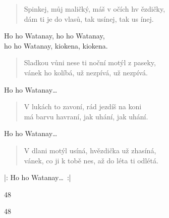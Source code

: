 \begin{song}{}
\begin{verse}
   Spinkej, můj maličký, máš v očích hv ězdičky, \\
   dám ti je do vlasů, tak usínej, tak us ínej.
\end{verse}
\begin{refren}
   Ho ho Watanay, ho ho Watanay, \\
   ho ho Watanay, kiokena, kiokena.
\end{refren}
\begin{verse}
   Sladkou vůni nese ti noční motýl z paseky,         \\
   vánek ho kolíbá, už nezpívá, už nezpívá.
\end{verse}
\begin{refren}
   Ho ho Watanay\ldots %
\end{refren}
\begin{verse}
   V lukách to zavoní, rád jezdíš na koni              \\
   má barvu havraní, jak uhání, jak uhání.
\end{verse}
\begin{refren}
   Ho ho Watanay\ldots %
\end{refren}
\begin{verse}
   V dlani motýl usíná, hvězdička už zhasíná, \\
   vánek, co ji k tobě nes, až do léta ti odlétá.
\end{verse}
\begin{refren}
   |: Ho ho Watanay\ldots~:|
\end{refren}

  \begin{tab}
    \begin{tabbar}{4}{8}
      \tabchordD[2,1]
      \barline
    \end{tabbar}
   \begin{tabbar}{4}{8}
      \tabchordC[2,1]
      \barline
      \tabchordD[2,2]
    \end{tabbar}
  \end{tab}

\end{song}
\pagebreak

